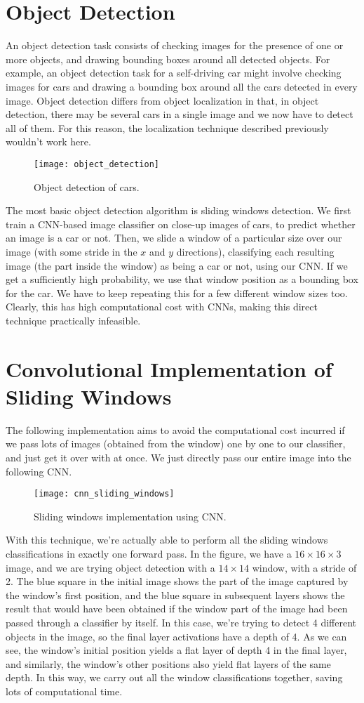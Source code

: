 \documentclass[a4paper, 12pt]{report}
\begin{document}
\section{Object Detection}
An object detection task consists of checking images for the presence of one or more objects, and drawing bounding boxes around all detected objects. For example, an object detection task for a self-driving car might involve checking images for cars and drawing a bounding box around all the cars detected in every image. Object detection differs from object localization in that, in object detection, there may be several cars in a single image and we now have to detect all of them. For this reason, the localization technique described previously wouldn't work here.
\begin{figure}[H]
\centering
\texttt{[image: object\_detection]}
\caption{Object detection of cars.}
\end{figure}
The most basic object detection algorithm is sliding windows detection. We first train a CNN-based image classifier on close-up images of cars, to predict whether an image is a car or not. Then, we slide a window of a particular size over our image (with some stride in the $x$ and $y$ directions), classifying each resulting image (the part inside the window) as being a car or not, using our CNN. If we get a sufficiently high probability, we use that window position as a bounding box for the car. We have to keep repeating this for a few different window sizes too. Clearly, this has high computational cost with CNNs, making this direct technique practically infeasible.

\section{Convolutional Implementation of Sliding Windows}
The following implementation aims to avoid the computational cost incurred if we pass lots of images (obtained from the window) one by one to our classifier, and just get it over with at once. We just directly pass our entire image into the following CNN.
\begin{figure}[H]
\centering
\texttt{[image: cnn\_sliding\_windows]}
\caption{Sliding windows implementation using CNN.}
\end{figure}
With this technique, we're actually able to perform all the sliding windows classifications in exactly one forward pass. In the figure, we have a $16\times 16\times 3$ image, and we are trying object detection with a $14\times 14$ window, with a stride of 2. The blue square in the initial image shows the part of the image captured by the window's first position, and the blue square in subsequent layers shows the result that would have been obtained if the window part of the image had been passed through a classifier by itself. In this case, we're trying to detect 4 different objects in the image, so the final layer activations have a depth of 4. As we can see, the window's initial position yields a flat layer of depth 4 in the final layer, and similarly, the window's other positions also yield flat layers of the same depth. In this way, we carry out all the window classifications together, saving lots of computational time.
\end{document}
